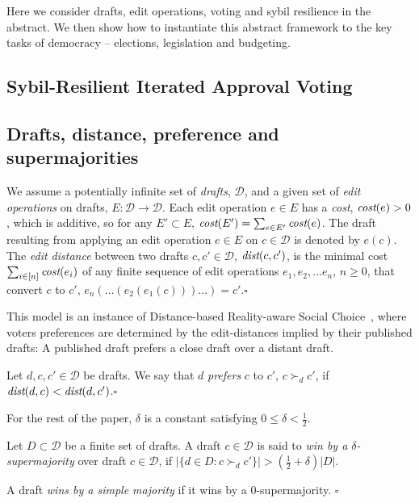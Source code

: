 \documentclass[sigconf]{aamas}  %
\newcommand{\qqed}{\hfill$\square$}
\newcommand{\calD}{\mathcal{D}}
\newcommand{\prefers}[1]{\succ_{#1}}
\newcommand{\dist}{\emph{dist}}
\newcommand{\cost}{\emph{cost}}
\begin{document}
Here we consider drafts, edit operations, voting and sybil resilience in the abstract.  We then show how to instantiate this abstract framework to  the key tasks of democracy -- elections, legislation and budgeting.


\subsection{Sybil-Resilient Iterated Approval Voting}


\subsection{Drafts, distance, preference and supermajorities}

\begin{definition}
%
We assume a potentially infinite set of \emph{drafts}, $\calD$, and a given set of \emph{edit operations} on drafts, $E: \calD \rightarrow \calD$. Each edit operation $e \in E$ has a \emph{cost}, $\cost(e) > 0$,  which is additive, so for any $E' \subset E$, $\cost(E') = \sum_{e \in E'} \cost(e)$. The draft resulting from applying an edit operation $e \in E$ on  $c \in \calD$ is denoted by $e(c)$.  The \emph{edit distance} between two drafts $c, c' \in \calD$, $\dist(c, c')$, is the minimal cost $\sum_{i \in [n]} \cost(e_i)$ of any finite sequence of edit operations $e_1, e_2, \ldots e_n$, $n \ge 0$, that convert $c$  to $c'$, $e_n(\ldots(e_2(e_1(c)))\ldots) = c'$.\qqed  
%
\end{definition}

This model is an instance of Distance-based Reality-aware Social Choice~\cite{realsoc}, where voters preferences are determined by the edit-distances implied by their published drafts:  A published draft prefers a close draft over a distant draft.

\begin{definition}[Prefers]\label{lemma:prefers}
%
Let $d, c, c' \in \calD$ be drafts.  We say that  $d$ \emph{prefers}  $c$ to $c'$, $ c \prefers{d} c'$, if $\dist(d, c) < \dist(d, c')$.\qqed
\end{definition}


For the rest of the paper, $\delta$ is a constant satisfying $0 \le \delta < \frac{1}{2}$.

\begin{definition}
%
Let $D \subset \calD$ be a finite set of drafts. A draft $c \in \calD$ is said to \emph{win by a $\delta$-supermajority} over draft  $c \in \calD$, if $|\{ d \in D : c \prefers{d} c' \}|  > (\frac{1}{2}+\delta) |D|$.


A draft \emph{wins by a simple majority} if it wins by a $0$-supermajority.
%
\qqed\end{definition}
\end{document}
